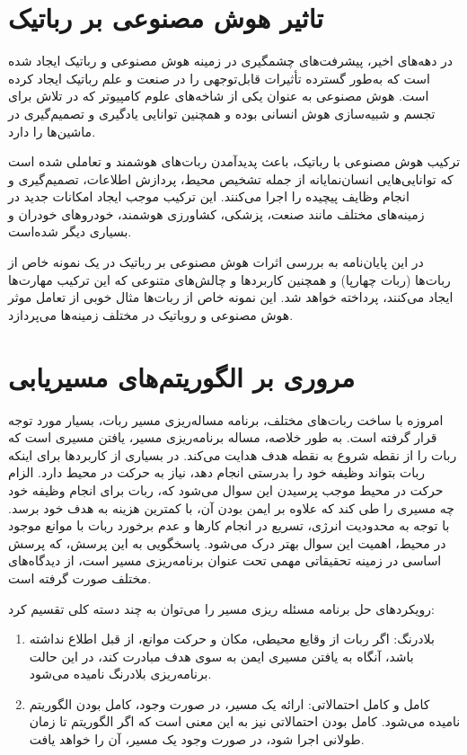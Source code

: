 \section{تاثیر هوش مصنوعی بر رباتیک}

در دهه‌های اخیر، پیشرفت‌های چشمگیری در زمینه هوش مصنوعی و رباتیک ایجاد شده است که به‌طور گسترده تأثیرات قابل‌توجهی را در صنعت و علم رباتیک ایجاد کرده است. هوش مصنوعی به عنوان یکی از شاخه‌های علوم کامپیوتر که در تلاش برای تجسم و شبیه‌سازی هوش انسانی بوده و همچنین توانایی یادگیری و تصمیم‌گیری در ماشین‌ها را دارد.

ترکیب هوش مصنوعی با رباتیک، باعث پدیدآمدن ربات‌های هوشمند و تعاملی شده است که توانایی‌هایی انسان‌نمایانه از جمله تشخیص محیط، پردازش اطلاعات، تصمیم‌گیری و انجام وظایف پیچیده را اجرا می‌کنند. این ترکیب موجب ایجاد امکانات جدید در زمینه‌های مختلف مانند صنعت، پزشکی، کشاورزی هوشمند، خودروهای خودران و بسیاری دیگر شده‌است.

در این پایان‌نامه به بررسی اثرات هوش مصنوعی بر رباتیک در یک نمونه خاص از ربات‌ها (ربات چهارپا) و همچنین کاربردها و چالش‌های متنوعی که این ترکیب مهارت‌ها ایجاد می‌کنند، پرداخته خواهد شد. این نمونه خاص‌ از ربات‌ها مثال خوبی از تعامل موثر هوش مصنوعی و روباتیک در مختلف زمینه‌ها می‌پردازد.

\section{مروری بر الگوریتم‌های مسیریابی}\label{مروری بر الگوریتم‌های مسیریابی}

امروزه با ساخت ربات‌های مختلف، برنامه مساله‌ریزی مسیر ربات، بسیار
مورد توجه قرار گرفته است. به طور خلاصه، مساله برنامه‌ریزی مسیر،
یافتن مسیری است که ربات را از نقطه شروع به نقطه هدف هدایت
می‌کند.
\cite{}
در بسیاری از کاربردها برای اینکه ربات بتواند وظیفه خود را
بدرستی انجام دهد، نیاز به حرکت در محیط دارد. الزام حرکت در محیط موجب پرسیدن این سوال می‌شود که، ربات برای انجام وظیفه خود چه مسیری را طی کند که علاوه بر ایمن بودن آن، با کمترین هزینه به هدف خود برسد. با توجه به محدودیت انرژی، تسریع در انجام کارها و عدم
برخورد ربات با موانع موجود در محیط، اهمیت این سوال بهتر درک می‌شود. پاسخگویی به این پرسش، که پرسش اساسی در زمینه تحقیقاتی مهمی تحت عنوان برنامه‌ریزی مسیر است، از دیدگاه‌های مختلف صورت گرفته است.

رویکردهای حل برنامه مسئله ریزی مسیر را می‌توان به چند دسته کلی تقسیم کرد:
\begin{enumerate}
	\item
	بلادرنگ: اگر ربات از وقایع محیطی، مکان و حرکت موانع، از قبل اطلاع نداشته باشد، آنگاه به یافتن مسیری ایمن به سوی هدف مبادرت کند، در این حالت برنامه‌ریزی بلادرنگ نامیده می‌شود.
	\cite{}
	\item
	کامل و کامل احتمالاتی: ارائه یک مسیر، در صورت وجود، کامل بودن
	الگوریتم نامیده می‌شود. کامل بودن احتمالاتی نیز به این معنی است که اگر الگوریتم تا زمان طولانی اجرا شود، در صورت وجود یک مسیر، آن را خواهد یافت.
	\cite{}
	
\end{enumerate}

